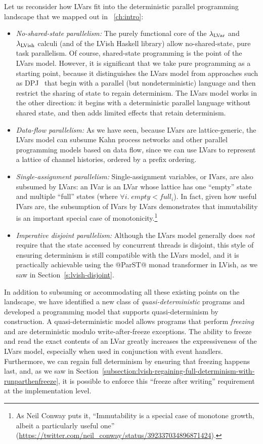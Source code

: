 Let us reconsider how LVars fit into the deterministic parallel
programming landscape that we mapped out in ~\ref{ch:intro}:
\begin{itemize}
  \item \emph{No-shared-state parallelism:} The purely functional core
    of the $\lambda_{\textrm{LVar}}$ and $\lambda_{\textrm{LVish}}$ calculi (and of the LVish
    Haskell library) allow no-shared-state, pure task parallelism.  Of
    course, shared-state programming is the point of the LVars model.
    However, it is significant that we take pure programming as a
    starting point, because it distinguishes the LVars model from
    approaches such as DPJ~\cite{dpj-oopsla} that begin with a
    parallel (but nondeterministic) language and then restrict the
    sharing of state to regain determinism.  The LVars model works in
    the other direction: it begins with a deterministic parallel
    language without shared state, and then adds limited effects that
    retain determinism.
  \item \emph{Data-flow parallelism:} As we have seen, because LVars
    are lattice-generic, the LVars model can subsume Kahn process
    networks and other parallel programming models based on data flow,
    since we can use LVars to represent a lattice of channel
    histories, ordered by a prefix ordering.
  \item \emph{Single-assignment parallelism:} Single-assignment
    variables, or IVars, are also subsumed by LVars: an IVar is an
    LVar whose lattice has one ``empty'' state and multiple ``full''
    states (where $\forall{i}.\; \mathit{empty} < \mathit{full_i}$).
    In fact, given how useful IVars are, the subsumption of IVars by
    LVars demonstrates that immutability is an important special case
    of monotonicity.\footnote{As Neil Conway puts it, ``Immutability
      is a special case of monotone growth, albeit a particularly
      useful one''
      (\url{https://twitter.com/neil_conway/status/392337034896871424}).}
  \item \emph{Imperative disjoint parallelism:} Although the LVars
    model generally does \emph{not} require that the state accessed by
    concurrent threads is disjoint, this style of ensuring determinism
    is still compatible with the LVars model, and it is practically
    achievable using the @ParST@ monad transformer in LVish, as we saw
    in Section~\ref{s:lvish-disjoint}.
\end{itemize}
In addition to subsuming or accommodating all these existing points on
the landscape, we have identified a new class of
\emph{quasi-deterministic} programs and developed a programming model
that supports quasi-determinism by construction.  A
quasi-deterministic model allows programs that perform \emph{freezing}
and are deterministic modulo write-after-freeze exceptions.  The
ability to freeze and read the exact contents of an LVar greatly
increases the expressiveness of the LVars model, especially when used
in conjunction with event handlers.  Furthermore, we can regain full
determinism by ensuring that freezing happens last, and, as we saw in
Section~\ref{subsection:lvish-regaining-full-determinism-with-runparthenfreeze},
it is possible to enforce this ``freeze after writing'' requirement at
the implementation level.

